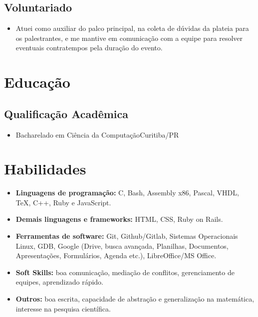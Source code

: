 \documentclass[a4paper, 12pt]{moderncv}
\begin{document}
\vspace{4pt}
\subsection{\small{Voluntariado}}
\begin{itemize}
    \item{
            {\vspace{3pt}Atuei como auxiliar do palco principal, na coleta de dúvidas
                da plateia para os palestrantes, e me mantive em comunicação com a equipe
            para resolver eventuais contratempos pela duração do evento.}}
        \vspace{4pt}
\end{itemize}
\vspace{4pt}

\section{Educação}
\vspace{1pt}
\subsection{\small{Qualificação Acadêmica}}
\vspace{2pt}
\begin{itemize}
    \item{
        {Bacharelado em Ciência da Computação}{Curitiba/PR}{}{}}
\end{itemize}
\vspace{4pt}

\section{Habilidades}
\vspace{4pt}
\begin{itemize}
    \item{\textbf{Linguagens de programação:} C, Bash, Assembly x86, Pascal, VHDL,
        \TeX, C++, Ruby e JavaScript.}
    \vspace{4pt}
    \item{\textbf{Demais linguagens e frameworks:} HTML, CSS, Ruby on Rails.}
    \vspace{4pt}
    \item{\textbf{Ferramentas de software:} Git, Github/Gitlab, Sistemas
        Operacionais Linux, GDB, Google (Drive, busca avançada, Planilhas,
        Documentos, Apresentações, Formulários, Agenda etc.), LibreOffice/MS
        Office.}
    \vspace{4pt}
    \item{\textbf{Soft Skills:} boa comunicação, mediação de conflitos, gerenciamento
        de equipes, aprendizado rápido.}
    \vspace{4pt}
    \item{\textbf{Outros:} boa escrita, capacidade de abstração e generalização na
        matemática, interesse na pesquisa científica.}
\end{itemize}
\vspace{4pt}
\end{document}
